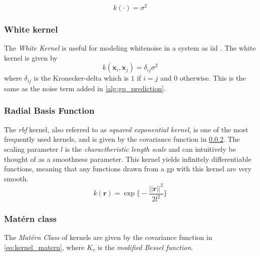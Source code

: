 \begin{equation}
    k(\boldsymbol{\cdot}) = \sigma^2
\end{equation}

\subsubsection{White kernel}
The \textit{White Kernel} is useful for modeling whitenoise in a system as \acrshort{iid} \cite{scikit-learn}. The white kernel is given by
\begin{equation}
    k(\boldsymbol{x}_i, \boldsymbol{x}_j) = \delta_{ij} \sigma^2
\end{equation}
where $\delta_{ij}$ is the Kronecker-delta which is $1$ if $i=j$ and $0$ otherwise. This is the same as the noise term added in \cref{alg:gp_prediction}.

\subsubsection{Radial Basis Function}\label{sec:kernels_rbf}
The \textit{\acrfull{rbf}} kernel, also referred to as \textit{squared exponential kernel}, is one of the most frequently used kernels, and is given by the covariance function in \cref{sec:kernels_rbf}. The scaling parameter $l$ is the \textit{charactheristic length scale} and can intuitively be thought of as a smoothness parameter. This kernel yields infinitely differentiable functions, meaning that any functions drawn from a \acrshort{gp} with this kernel are very smooth\cite{rasmussen}.
\begin{equation}\label{eq:kernel_rbf}
    k(\boldsymbol{r}) = \exp \big\{-\frac{||\boldsymbol{r}||^2}{2 l^2}\big\}
\end{equation} 

\subsubsection{Matérn class}
The \textit{Matérn Class} of kernels are given by the covariance function in \cref{eq:kernel_matern}, where $K_v$ is the \textit{modified Bessel function}. 

